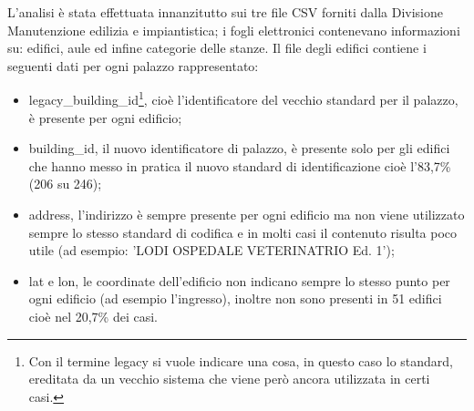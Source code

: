 \documentclass[12pt]{report}
\begin{document}
\vspace{5mm} %

L'analisi è stata effettuata innanzitutto sui tre file CSV forniti dalla Divisione Manutenzione edilizia e impiantistica; i fogli elettronici contenevano informazioni su: edifici, aule ed infine categorie delle stanze.
Il file degli edifici contiene i seguenti dati per ogni palazzo rappresentato:
\begin{itemize}
\item legacy\_building\_id\footnote{Con il termine legacy si vuole indicare una cosa, in questo caso lo standard, ereditata da un vecchio sistema che viene però ancora utilizzata in certi casi.
}, cioè l'identificatore del vecchio standard per il palazzo, è presente per ogni edificio;
\item building\_id, il nuovo identificatore di palazzo, è presente solo per gli edifici che hanno messo in pratica il nuovo standard di identificazione cioè l'83,7\% (206 su 246);
\item address, l'indirizzo è sempre presente per ogni edificio ma non viene utilizzato sempre lo stesso standard di codifica e in molti casi il contenuto risulta poco utile (ad esempio: 'LODI OSPEDALE VETERINATRIO Ed. 1');
\item lat e lon, le coordinate dell'edificio non indicano sempre lo stesso punto per ogni edificio (ad esempio l'ingresso), inoltre non sono presenti in 51 edifici cioè nel 20,7\% dei casi.
\end{itemize}

\vspace{5mm} %
\end{document}
